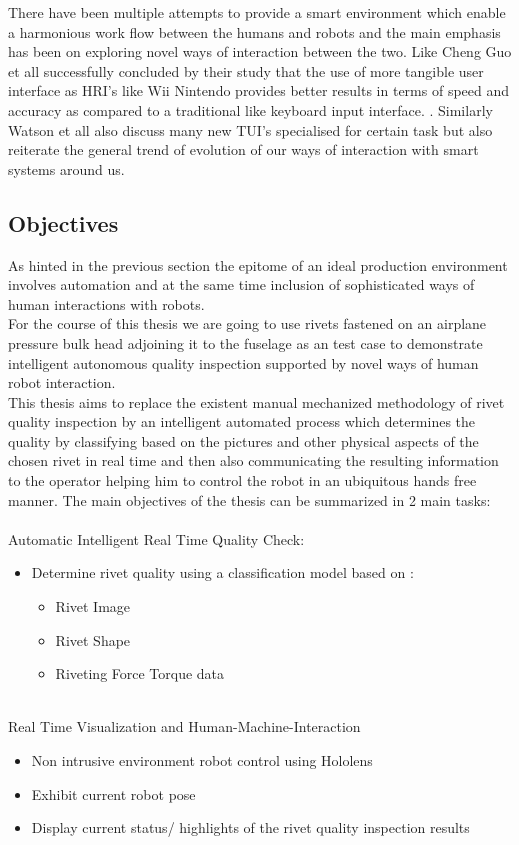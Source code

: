 \documentclass{article}
\begin{document}
There have been multiple attempts to provide a smart environment which enable a harmonious work flow between the humans and robots and the main emphasis has been on exploring novel ways of interaction between the two. Like Cheng Guo et all successfully concluded by their study that the use of more tangible user interface as HRI's like Wii Nintendo provides better results in terms of speed and accuracy as compared to a traditional like keyboard input interface. \cite{Guo:2008:EUT:1357054.1357076}. Similarly Watson et all also discuss many new TUI's specialised for certain task but also reiterate the general trend of evolution of our ways of interaction with smart systems around us.\cite{Sharlin:2004:TUI:1023813.1023818}

\subsection{Objectives}

As hinted in the previous section the epitome of an ideal production environment involves automation and at the same time inclusion of sophisticated ways of human interactions with robots.\\

For the course of this thesis we are going to use rivets fastened on an airplane pressure bulk head adjoining it to the fuselage as an test case to demonstrate intelligent autonomous quality inspection supported by novel ways of human robot interaction.\\

This thesis aims to replace the existent manual mechanized methodology of rivet quality inspection by an intelligent automated process which determines the quality by classifying based on the pictures and other physical aspects of the chosen rivet in real time and then also communicating the resulting information to the operator helping him to control the robot in an ubiquitous hands free manner.\newline
The main objectives of the thesis can be summarized in 2 main tasks:\\\\
Automatic Intelligent Real Time Quality Check:
\begin{itemize}
    \item Determine rivet quality using a classification model based on :
    \begin{itemize}
    \item Rivet Image
    \item Rivet Shape 
    \item Riveting Force Torque data
    \end{itemize}
\end{itemize}\\
Real Time Visualization and Human-Machine-Interaction
\begin{itemize}
    \item Non intrusive environment robot control using Hololens
    \item Exhibit current robot pose
    \item Display current status/ highlights of the rivet quality inspection results

\end{itemize}
\end{document}
